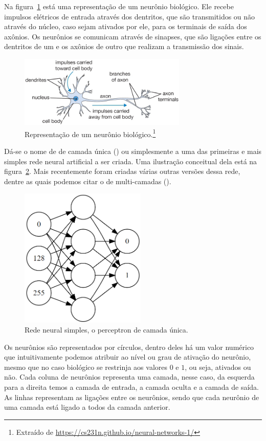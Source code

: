 Na figura~\ref{fig:neuron} está uma representação de um neurônio biológico. Ele recebe impulsos elétricos de entrada através dos dentritos, que são transmitidos ou não através do núcleo, caso sejam ativados por ele, para os terminais de saída dos axônios. Os neurônios se comunicam através de sinapses, que são ligações entre os dentritos de um e os axônios de outro que realizam a transmissão dos sinais. 

\begin{figure}[htb]
\centering
\includegraphics[width=8cm]{figuras/neuron}
\caption{Representação de um neurônio biológico.\footnote{Extraído de \url{https://cs231n.github.io/neural-networks-1/}}}
\label{fig:neuron}
\end{figure}

Dá-se o nome de  de camada única () ou simplesmente  a uma das primeiras e mais simples rede neural artificial a ser criada. Uma ilustração conceitual dela está na figura~\ref{fig:perceptron}. Mais recentemente foram criadas várias outras versões dessa rede, dentre as quais podemos citar o  de multi-camadas (). 

\begin{figure}[htb]
\centering
\includegraphics[width=6cm]{figuras/perceptron}
\caption{Rede neural simples, o perceptron de camada única.}
\label{fig:perceptron}
\end{figure}

Os neurônios são representados por círculos, dentro deles há um valor numérico que intuitivamente podemos atribuir ao nível ou grau de ativação do neurônio, mesmo que no caso biológico se restrinja aos valores $0$ e $1$, ou seja, ativados ou não. Cada coluna de neurônios representa uma camada, nesse caso, da esquerda para a direita temos a camada de entrada, a camada oculta e a camada de saída. As linhas representam as ligações entre os neurônios, sendo que cada neurônio de uma camada está ligado a todos da camada anterior.

